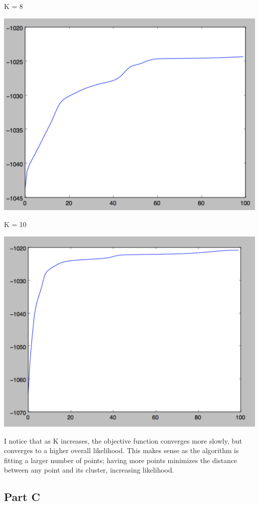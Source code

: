 \documentclass[twoside,11pt]{homework}
\begin{document}
K = 8

\includegraphics[scale=.5]{images/em_8_obj.png}

K = 10

\includegraphics[scale=.5]{images/em_10_obj.png}

I notice that as K increases, the objective function converges more slowly, but converges to a higher overall likelihood. This makes sense as the algorithm is fitting a larger number of points; having more points minimizes the distance between any point and its cluster, increasing likelihood.

\subsection*{Part C}
\end{document}
